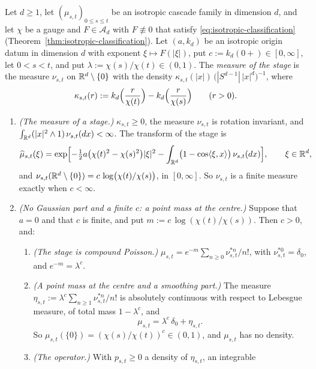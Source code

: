 \begin{proposition}\label{prop:isotropic-stages}
Let $d \ge 1$, let $(\mu_{s,t})_{0 \le s \le t}$ be an isotropic cascade family in dimension $d$,
and let $\chi$ be a gauge and $F \in \mathcal{A}_d$ with $F \not\equiv 0$ that satisfy
\ref{eq:isotropic-classification} (Theorem~\ref{thm:isotropic-classification}). Let $(a, k_d)$ be
an isotropic origin datum in dimension $d$ with exponent $\xi \mapsto F(|\xi|)$, put
$c := k_d(0{+}) \in [0,\infty]$, let $0 < s < t$, and put
$\lambda := \chi(s)/\chi(t) \in (0,1)$. The \emph{\Levy{} measure of the stage} is the measure
$\nu_{s,t}$ on $\mathbb{R}^d \setminus \{0\}$ with the density
$\kappa_{s,t}(|x|)\,\bigl(|S^{d-1}|\,|x|^d\bigr)^{-1}$, where
\[
  \kappa_{s,t}(r) := k_d\Bigl(\frac{r}{\chi(t)}\Bigr) - k_d\Bigl(\frac{r}{\chi(s)}\Bigr)
  \qquad (r > 0) .
\]
\begin{enumerate}
\item \emph{(The \Levy{} measure of a stage.)} $\kappa_{s,t} \ge 0$, the measure $\nu_{s,t}$ is
rotation invariant, and $\int_{\mathbb{R}^d}(|x|^2 \wedge 1)\,\nu_{s,t}(dx) < \infty$. The transform of
the stage is
\begin{equation}\label{eq:stage-transform}
  \widehat\mu_{s,t}(\xi) = \exp\Bigl[-\tfrac12 a\bigl(\chi(t)^2 - \chi(s)^2\bigr)|\xi|^2
     - \int_{\mathbb{R}^d}\bigl(1 - \cos\langle\xi,x\rangle\bigr)\,\nu_{s,t}(dx)\Bigr],
  \qquad \xi \in \mathbb{R}^d ,
\end{equation}
and $\nu_{s,t}(\mathbb{R}^d \setminus \{0\}) = c\,\log\bigl(\chi(t)/\chi(s)\bigr)$, in $[0,\infty]$. So
$\nu_{s,t}$ is a finite measure exactly when $c < \infty$.
\item \emph{(No Gaussian part and a finite $c$: a point mass at the centre.)} Suppose that
$a = 0$ and that $c$ is finite, and put $m := c\,\log(\chi(t)/\chi(s))$. Then $c > 0$, and:
\begin{enumerate}
\item[(a)] \emph{(The stage is compound Poisson.)}
$\mu_{s,t} = e^{-m}\sum_{n \ge 0}\nu_{s,t}^{*n}/n!$, with $\nu_{s,t}^{*0} = \delta_0$, and
$e^{-m} = \lambda^c$.
\item[(b)] \emph{(A point mass at the centre and a smoothing part.)} The measure
$\eta_{s,t} := \lambda^c\sum_{n \ge 1}\nu_{s,t}^{*n}/n!$ is absolutely continuous with respect
to Lebesgue measure, of total mass $1 - \lambda^c$, and
\[
  \mu_{s,t} = \lambda^c\,\delta_0 + \eta_{s,t} .
\]
So $\mu_{s,t}(\{0\}) = (\chi(s)/\chi(t))^c \in (0,1)$, and $\mu_{s,t}$ has no density.
\item[(c)] \emph{(The operator.)} With $p_{s,t} \ge 0$ a density of $\eta_{s,t}$, an integrable

\end{enumerate}
\end{enumerate}
\end{proposition}

